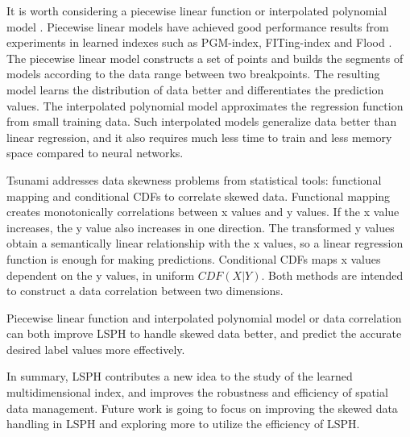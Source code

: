 It is worth considering a piecewise linear function or interpolated polynomial model \cite{setiawan2020function}. Piecewise linear models have achieved good performance results from experiments in learned indexes such as PGM-index, FITing-index and Flood \cite{Ferragina:ud, Galakatos:2019ke, Nathan:2019wc}. The piecewise linear model constructs a set of points and builds the segments of models according to the data range between two breakpoints. The resulting model learns the distribution of data better and differentiates the prediction values.  The interpolated polynomial model approximates the regression function from small training data. Such interpolated models generalize data better than linear regression, and it also requires much less time to train and less memory space compared to neural networks. 

Tsunami \cite{Ding:2020we} addresses data skewness problems from statistical tools: functional mapping and conditional CDFs to correlate skewed data. Functional mapping creates monotonically correlations between x values and y values. If the x value increases, the y value also increases in one direction. The transformed y values obtain a semantically linear relationship with the x values, so a linear regression function is enough for making predictions. Conditional CDFs maps x values dependent on the y values, in uniform $CDF(X|Y)$. Both methods are intended to construct a data correlation between two dimensions. 

Piecewise linear function and interpolated polynomial model or data correlation can both improve LSPH to handle skewed data better, and predict the accurate desired label values more effectively.  

In summary, LSPH contributes a new idea to the study of the learned multidimensional index, and improves the robustness and efficiency of spatial data management. Future work is going to focus on improving the skewed data handling in LSPH and exploring more to utilize the efficiency of LSPH.

